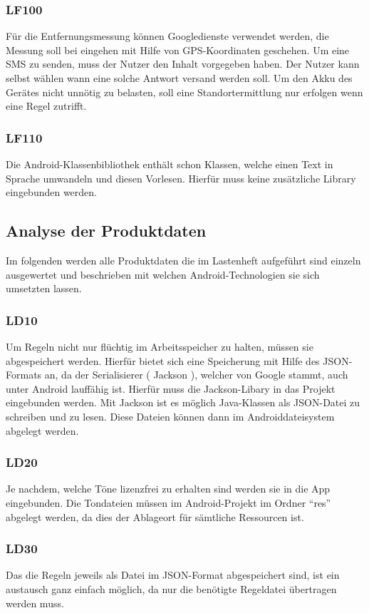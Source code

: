 \subsubsection{LF100}
F\"ur die Entfernungsmessung k\"onnen Googledienste verwendet werden, die Messung soll bei eingehen mit Hilfe von GPS-Koordinaten geschehen. Um eine SMS zu senden, muss der Nutzer den Inhalt vorgegeben haben. Der Nutzer kann selbst w\"ahlen wann eine solche Antwort versand werden soll. Um den Akku des Ger\"ates nicht unn\"otig zu belasten, soll eine Standortermittlung nur erfolgen wenn eine Regel zutrifft.

\subsubsection{LF110}
Die Android-Klassenbibliothek enth\"alt schon Klassen, welche einen Text in Sprache umwandeln und diesen Vorlesen. Hierf\"ur muss keine zus\"atzliche Library eingebunden werden.

\subsection{Analyse der Produktdaten}
Im folgenden werden alle Produktdaten die im Lastenheft aufgef\"uhrt sind einzeln ausgewertet und beschrieben mit welchen Android-Technologien sie sich umsetzten lassen.

\subsubsection{LD10}
Um Regeln nicht nur fl\"uchtig im Arbeitsspeicher zu halten, m\"ussen sie abgespeichert werden. Hierf\"ur bietet sich eine Speicherung mit Hilfe des JSON-Formats an, da der Serialisierer ( Jackson ), welcher von Google stammt, auch unter Android lauff\"ahig ist. Hierf\"ur muss die Jackson-Libary in das Projekt eingebunden werden.
Mit Jackson ist es m\"oglich Java-Klassen als JSON-Datei zu schreiben und zu lesen. Diese Dateien k\"onnen dann im Androiddateisystem abgelegt werden.

\subsubsection{LD20}
Je nachdem, welche T\"one lizenzfrei zu erhalten sind werden sie in die App eingebunden. Die Tondateien m\"ussen im Android-Projekt im Ordner "`res"' abgelegt werden, da dies der Ablageort f\"ur s\"amtliche Ressourcen ist.

\subsubsection{LD30}
Das die Regeln jeweils als Datei im JSON-Format abgespeichert sind, ist ein austausch ganz einfach m\"oglich, da nur die ben\"otigte Regeldatei \"ubertragen werden muss.

